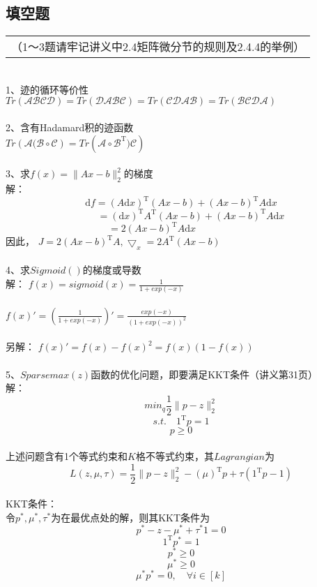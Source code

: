 \documentclass[UFT8]{ctexart}
\begin{document}
\subsection{填空题}
\begin{tabular}{@{} l @{}}
\hline
（1～3题请牢记讲义中2.4矩阵微分节的规则及2.4.4的举例）
\end{tabular}
~\\
1、迹的循环等价性\\
$Tr(\mathcal{ABCD}) = Tr(\mathcal{DABC}) = Tr(\mathcal{CDAB}) = Tr(\mathcal{BCDA})$\\
~\\
2、含有Hadamard积的迹函数 \\
$Tr(\mathcal{A(B\circ C}) = Tr(\mathcal{A\circ B^\mathrm{T})C})$
~\\
~\\
3、求$f(x) = \big\|Ax - b\|_{2} ^{2}$的梯度\\
解：
\begin{displaymath}
\mathrm{d}f = (A\mathrm{d} x)^\mathrm{T}(Ax - b) + (Ax - b)^\mathrm{T}A\mathrm{d} x  
\end{displaymath}
\begin{displaymath}
 \quad \quad = (\mathrm{d}x)^\mathrm{T}A^\mathrm{T}(Ax - b) + (Ax - b)^\mathrm{T}A\mathrm{d}x 
\end{displaymath}
\begin{displaymath}
 =  2(Ax - b)^\mathrm{T}A\mathrm{d}x \quad \qquad \quad  \quad \quad 
 \end{displaymath}
 因此，
 $ J = 2(Ax - b)^\mathrm{T}A, \bigtriangledown_{x} = 2A^\mathrm{T}(Ax - b)$
 ~\\
 ~\\
 4、求$Sigmoid()$的梯度或导数 \\
 解：
 $ f(x) = sigmoid(x)  = \frac{1}{1 + exp(-x)}$\\
 ~\\
 $f(x)' = (\frac{1}{1 + exp(-x)})' =\frac{exp(-x)}{(1 + exp(-x))^{2}} $\\
 ~\\
 另解：
 $f(x)' = f(x) - f(x)^{2} = f(x)(1 - f(x)) $
 ~\\
 ~\\
 5、$Sparsemax(z)$函数的优化问题，即要满足KKT条件（讲义第31页）\\
 解：
 \[ min_{q} \frac{1}{2} \big\|p - z\|_{2}^{2} \]  
 \[s.t. \quad 1^\mathrm{T}p = 1 \] 
 \[ p \geq 0 \] 
 ~\\
 上述问题含有1个等式约束和$K$格不等式约束，其$Lagrangian$为\\
 \[ L(z,\mu,\tau) = \frac{1}{2}\big\|p -z\|_{2}^{2} - (\mu)^\mathrm{T}p + \tau(1^\mathrm{T}p -1) \]
 ~\\
 KKT条件：\\
 令$p^{*},\mu^{*},\tau^{*}$为在最优点处的解，则其KKT条件为 \\
 \[ p^{*} - z - \mu^{*} + \tau^{*}1 = 0 \]
 \[ 1^\mathrm{T}p^{*} = 1 \]
\[ p^{*} \geq 0 \]
\[ \mu^{*} \geq 0 \]
\[ \mu^{*}p^{*} = 0, \quad \forall i \in [k] \]
~\\
\end{document}
